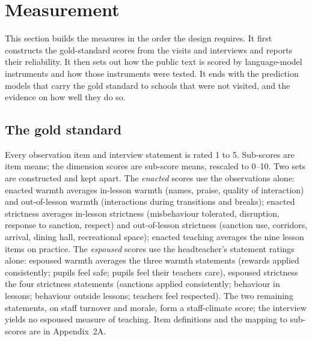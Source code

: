 
\section{Measurement}
\label{sec:p1_measurement}

This section builds the measures in the order the design requires. It first
constructs the gold-standard scores from the visits and interviews and reports
their reliability. It then sets out how the public text is scored by
language-model instruments and how those instruments were tested. It ends
with the prediction models that carry the gold standard to schools that were
not visited, and the evidence on how well they do so.

\subsection{The gold standard}

Every observation item and interview statement is rated 1 to 5. Sub-scores
are item means; the dimension scores are sub-score means, rescaled to 0--10.
Two sets are constructed and kept apart. The \emph{enacted} scores use the
observations alone: enacted warmth averages in-lesson warmth (names, praise,
quality of interaction) and out-of-lesson warmth (interactions during
transitions and breaks); enacted strictness averages in-lesson strictness
(misbehaviour tolerated, disruption, response to sanction, respect) and
out-of-lesson strictness (sanction use, corridors, arrival, dining hall,
recreational space); enacted teaching averages the nine lesson items on
practice. The \emph{espoused} scores use the headteacher's statement ratings
alone: espoused warmth averages the three warmth statements (rewards applied
consistently; pupils feel safe; pupils feel their teachers care), espoused
strictness the four strictness statements (sanctions applied consistently;
behaviour in lessons; behaviour outside lessons; teachers feel respected). The
two remaining statements, on staff turnover and morale, form a staff-climate
score; the interview yields no espoused measure of teaching. Item definitions
and the mapping to sub-scores are in Appendix~2A.

